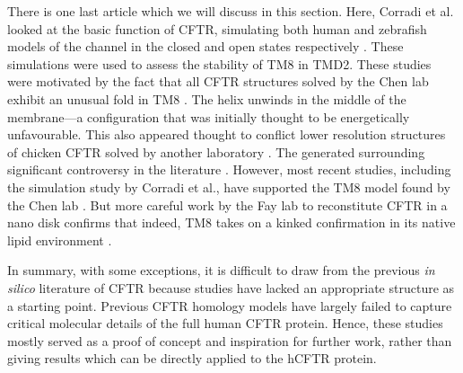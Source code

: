 
There is one last article which we will discuss in this section. Here, Corradi et al. looked at the basic function of CFTR, simulating both human and zebrafish models of the channel in the closed and open states respectively \cite{corradi2018}. These simulations were used to assess the stability of TM8 in TMD2. These studies were motivated by the fact that all CFTR structures solved by the Chen lab exhibit an unusual fold in TM8 \cite{fiedorczuk2021, liu2017, liu2019, zhang2016, zhang2018a, zhang2017a}. The helix unwinds in the middle of the membrane---a configuration that was initially thought to be energetically unfavourable. This also appeared thought to conflict lower resolution structures of chicken CFTR solved by another laboratory \cite{fay2018}. The generated surrounding significant controversy in the literature \cite{negoda2019, hegedus2022, infield2021, thomas2020}. However, most recent studies, including the simulation study by Corradi et al., have supported the TM8 model found by the Chen lab \cite{corradi2018, negoda2019}. But more careful work by the Fay lab to reconstitute CFTR in a nano disk confirms that indeed, TM8 takes on a kinked confirmation in its native lipid environment \cite{aleksandrov2022}.

In summary, with some exceptions, it is difficult to draw from the previous \textit{in silico} literature of CFTR because studies have lacked an appropriate structure as a starting point. Previous CFTR homology models have largely failed to capture critical molecular details of the full human CFTR protein. Hence, these studies mostly served as a proof of concept and inspiration for further work, rather than giving results which can be directly applied to the hCFTR protein. 


